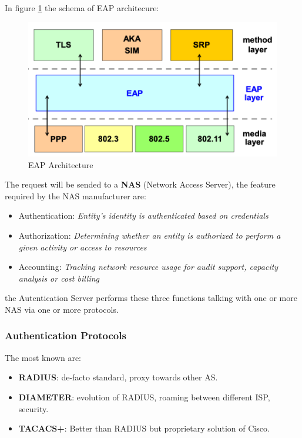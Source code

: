\documentclass[12pt]{article}
\begin{document}
In figure \ref{fig:eap} the schema of EAP architecure:
\begin{figure}[H]
   \centering
   \includegraphics[width=\linewidth]{images/eap.png}
   \caption{EAP Architecture}
   \label{fig:eap}
\end{figure}
The request will be sended to a \textbf{NAS} (Network Access Server), the feature required by the NAS manufacturer are:
\begin{itemize}
  \item Authentication: \textit{Entity's identity is authenticated based on credentials}
  \item Authorization: \textit{Determining whether an entity is authorized to perform a given activity or access to resources}
  \item Accounting: \textit{Tracking network resource usage for audit support, capacity analysis or cost billing}
\end{itemize}
the Autentication Server performs these three functions talking with one or more NAS via one or more protocols.

\subsubsection{Authentication Protocols}
The most known are:
\begin{itemize}
  \item \textbf{RADIUS}: de-facto standard, proxy towards other AS.
  \item \textbf{DIAMETER}: evolution of RADIUS, roaming between different ISP, security.
  \item \textbf{TACACS+}: Better than RADIUS but proprietary solution of Cisco.
\end{itemize}
\end{document}
